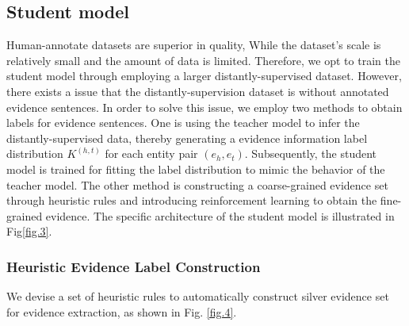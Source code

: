 \documentclass[preprint,12pt]{elsarticle}
\begin{document}
\subsection{Student model}\label{subsec2}
Human-annotate datasets are superior in quality, While the dataset’s scale is relatively small and the amount of data is limited. Therefore, we opt to train the student model through employing a larger distantly-supervised dataset\cite{mintz-etal-2009-distant}. However, there exists a issue that the distantly-supervision dataset is without annotated evidence sentences. In order to solve this issue, we employ two methods to obtain labels for evidence sentences. One is using the teacher model to infer the distantly-supervised data, thereby generating a evidence information label distribution $K^{(h,t)}$ for each entity pair $(e_h,e_t)$. Subsequently, the student model is trained for fitting the label distribution to mimic the behavior of the teacher model. The other method is constructing a coarse-grained evidence set through heuristic rules and introducing reinforcement learning to obtain the fine-grained evidence. The specific architecture of the student model is illustrated in Fig\ref{fig.3}.

\subsubsection{Heuristic Evidence Label Construction}\label{subsubsec5}
We devise a set of heuristic rules to automatically construct silver evidence set for evidence extraction, as shown in Fig. \ref{fig.4}.
\end{document}
